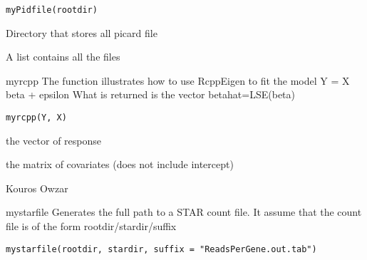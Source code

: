 \documentclass[letterpaper]{book}
\begin{document}
%
\begin{Usage}
\begin{verbatim}
myPidfile(rootdir)
\end{verbatim}
\end{Usage}
%
\begin{Arguments}
\begin{ldescription}
\item[\code{rootdir}] Directory that stores all picard  file
\end{ldescription}
\end{Arguments}
%
\begin{Value}
A list contains all the  files
\end{Value}
%
\begin{Description}\relax
myrcpp
The function illustrates how to use RcppEigen to fit the model
Y = X beta + epsilon
What is returned is the vector betahat=LSE(beta)
\end{Description}
%
\begin{Usage}
\begin{verbatim}
myrcpp(Y, X)
\end{verbatim}
\end{Usage}
%
\begin{Arguments}
\begin{ldescription}
\item[\code{Y}] the vector of response

\item[\code{X}] the matrix of covariates (does not include intercept)
\end{ldescription}
\end{Arguments}
%
\begin{Value}
\end{Value}
%
\begin{Author}\relax
Kouros Owzar
\end{Author}
%
\begin{Description}\relax
mystarfile
Generates the full path to a STAR count file.
It assume that the count file is of the form
rootdir/stardir/suffix
\end{Description}
%
\begin{Usage}
\begin{verbatim}
mystarfile(rootdir, stardir, suffix = "ReadsPerGene.out.tab")
\end{verbatim}
\end{Usage}
\end{document}
